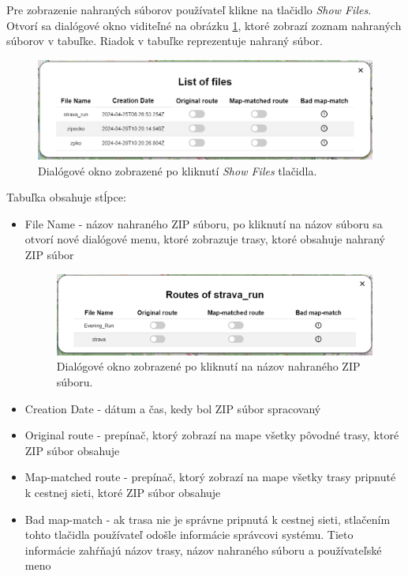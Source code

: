 Pre zobrazenie nahraných súborov používateľ klikne na tlačidlo \textit{Show Files}. Otvorí sa dialógové okno viditeľné na obrázku \ref{fig:uploaded_routes_dialog}, ktoré zobrazí zoznam nahraných súborov v tabuľke. Riadok v tabuľke reprezentuje nahraný súbor.
\begin{figure}[H]
  \centering
  \includegraphics[width=0.8 \textwidth]{img/tools-panel/uploaded-routes.png}
  \caption{Dialógové okno zobrazené po kliknutí \textit{Show Files} tlačidla.}
  \label{fig:uploaded_routes_dialog}
\end{figure}
\noindent Tabuľka obsahuje stĺpce:
\begin{itemize}
  \item File Name - názov nahraného ZIP súboru, po kliknutí na názov súboru sa otvorí nové dialógové menu, ktoré zobrazuje trasy, ktoré obsahuje nahraný ZIP súbor
        \begin{figure}[H]
          \centering
          \includegraphics[width=0.8 \textwidth]{img/tools-panel/routes-of-zip.png}
          \caption{Dialógové okno zobrazené po kliknutí na názov nahraného ZIP súboru.}
        \end{figure}
  \item Creation Date - dátum a čas, kedy bol ZIP súbor spracovaný
  \item Original route - prepínač, ktorý zobrazí na mape všetky pôvodné trasy, ktoré ZIP súbor obsahuje
  \item Map-matched route - prepínač, ktorý zobrazí na mape všetky trasy pripnuté k cestnej sieti, ktoré ZIP súbor obsahuje
  \item Bad map-match - ak trasa nie je správne pripnutá k cestnej sieti, stlačením tohto tlačidla používateľ odošle informácie správcovi systému. Tieto informácie zahŕňajú názov trasy, názov nahraného súboru a používateľské meno
\end{itemize}

